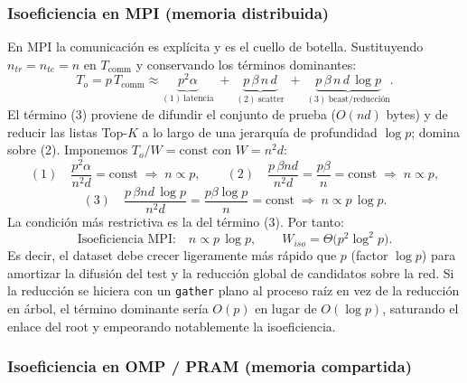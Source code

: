\subsubsection{Isoeficiencia en MPI (memoria distribuida)}

En MPI la comunicación es explícita y es el cuello de botella. Sustituyendo $n_{tr}=n_{te}=n$ en
$T_{\text{comm}}$ y conservando los términos dominantes:
\[
T_o = p\,T_{\text{comm}}
    \approx \underbrace{p^2\alpha}_{(1)\ \text{latencia}}
    \;+\; \underbrace{p\,\beta\, n\, d}_{(2)\ \text{scatter}}
    \;+\; \underbrace{p\,\beta\, n\, d\,\log p}_{(3)\ \text{bcast/reducción}}.
\]
El término (3) proviene de difundir el conjunto de prueba ($O(nd)$ bytes) y de reducir las listas
Top-$K$ a lo largo de una jerarquía de profundidad $\log p$; domina sobre (2). Imponemos
$T_o/W=\text{const}$ con $W=n^2 d$:
\[
(1)\quad \frac{p^2\alpha}{n^2 d}=\text{const} \;\Rightarrow\; n \propto p,
\qquad
(2)\quad \frac{p\,\beta n d}{n^2 d}=\frac{p\beta}{n}=\text{const} \;\Rightarrow\; n \propto p,
\]
\[
(3)\quad \frac{p\,\beta n d\,\log p}{n^2 d}=\frac{p\beta\log p}{n}=\text{const}
\;\Rightarrow\; n \propto p\,\log p.
\]
La condición más restrictiva es la del término (3). Por tanto:
\[
\boxed{\;
\text{Isoeficiencia MPI:}\quad n \propto p\,\log p,
\qquad
W_{iso} = \Theta\!\big(p^2 \log^2 p\big).
\;}
\]
Es decir, el dataset debe crecer ligeramente más rápido que $p$ (factor $\log p$) para amortizar
la difusión del test y la reducción global de candidatos sobre la red. Si la reducción se hiciera
con un \texttt{gather} plano al proceso raíz en vez de la reducción en árbol, el término dominante
sería $O(p)$ en lugar de $O(\log p)$, saturando el enlace del root y empeorando notablemente la
isoeficiencia.

\subsubsection{Isoeficiencia en OMP / PRAM (memoria compartida)}

